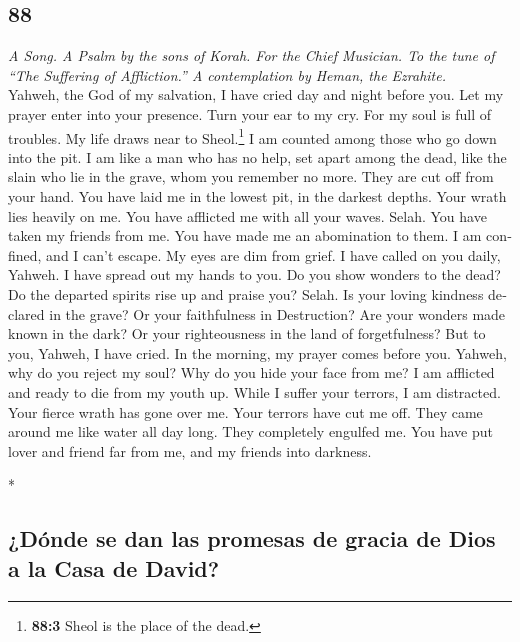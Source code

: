 \begin{paracol}{2}
\begin{otherlanguage}{english}
\hypertarget{section-175}{%
\section{88}\label{section-175}}

\emph{A Song. A Psalm by the sons of Korah. For the Chief Musician. To
the tune of ``The Suffering of Affliction.'' A contemplation by Heman,
the Ezrahite.}\\
 Yahweh, the God of my salvation, I have cried day and
night before you.  Let my prayer enter into your presence.
Turn your ear to my cry.  For my soul is full of troubles.
My life draws near to Sheol.\footnote{\textbf{88:3} Sheol is the place
  of the dead.}  I am counted among those who go down into
the pit. I am like a man who has no help,  set apart among
the dead, like the slain who lie in the grave, whom you remember no
more. They are cut off from your hand.  You have laid me
in the lowest pit, in the darkest depths.  Your wrath lies
heavily on me. You have afflicted me with all your waves. Selah.
 You have taken my friends from me. You have made me an
abomination to them. I am confined, and I can't escape. 
My eyes are dim from grief. I have called on you daily, Yahweh. I have
spread out my hands to you.  Do you show wonders to the
dead? Do the departed spirits rise up and praise you? Selah.
 Is your loving kindness declared in the grave? Or your
faithfulness in Destruction?  Are your wonders made known
in the dark? Or your righteousness in the land of forgetfulness?
 But to you, Yahweh, I have cried. In the morning, my
prayer comes before you.  Yahweh, why do you reject my
soul? Why do you hide your face from me?  I am afflicted
and ready to die from my youth up. While I suffer your terrors, I am
distracted.  Your fierce wrath has gone over me. Your
terrors have cut me off.  They came around me like water
all day long. They completely engulfed me.  You have put
lover and friend far from me, and my friends into darkness.

\end{otherlanguage}

\switchcolumn[0]*

\hypertarget{duxf3nde-se-dan-las-promesas-de-gracia-de-dios-a-la-casa-de-david}{%
\subsection{¿Dónde se dan las promesas de gracia de Dios a la Casa de
David?}\label{duxf3nde-se-dan-las-promesas-de-gracia-de-dios-a-la-casa-de-david}}


\end{paracol}

